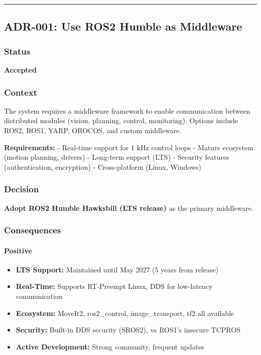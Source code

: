 \documentclass[
]{article}
\providecommand{\tightlist}{%
  \setlength{\itemsep}{0pt}\setlength{\parskip}{0pt}}
\begin{document}
\begin{center}\rule{0.5\linewidth}{0.5pt}\end{center}

\hypertarget{adr-001-use-ros2-humble-as-middleware}{%
\subsection{ADR-001: Use ROS2 Humble as
Middleware}\label{adr-001-use-ros2-humble-as-middleware}}

\hypertarget{status}{%
\subsubsection{Status}\label{status}}

\textbf{Accepted}

\hypertarget{context}{%
\subsubsection{Context}\label{context}}

The system requires a middleware framework to enable communication
between distributed modules (vision, planning, control, monitoring).
Options include ROS2, ROS1, YARP, OROCOS, and custom middleware.

\textbf{Requirements:} - Real-time support for 1 kHz control loops -
Mature ecosystem (motion planning, drivers) - Long-term support (LTS) -
Security features (authentication, encryption) - Cross-platform (Linux,
Windows)

\hypertarget{decision}{%
\subsubsection{Decision}\label{decision}}

\textbf{Adopt ROS2 Humble Hawksbill (LTS release)} as the primary
middleware.

\hypertarget{consequences}{%
\subsubsection{Consequences}\label{consequences}}

\hypertarget{positive}{%
\paragraph{Positive}\label{positive}}

\begin{itemize}
\tightlist
\item
  \textbf{LTS Support:} Maintained until May 2027 (5 years from release)
\item
  \textbf{Real-Time:} Supports RT-Preempt Linux, DDS for low-latency
  communication
\item
  \textbf{Ecosystem:} MoveIt2, ros2\_control, image\_transport, tf2 all
  available
\item
  \textbf{Security:} Built-in DDS security (SROS2), vs ROS1's insecure
  TCPROS
\item
  \textbf{Active Development:} Strong community, frequent updates
\end{itemize}
\end{document}
